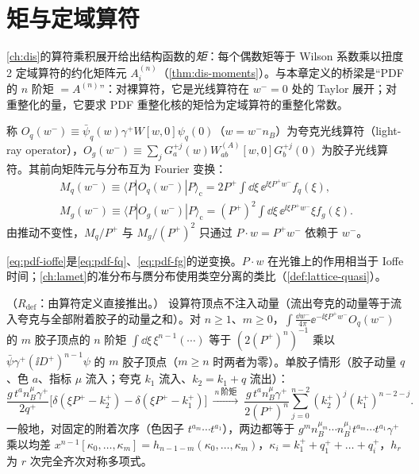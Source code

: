 \section{矩与定域算符}\label{sec:pdf-moments}

\cref{ch:dis}的算符乘积展开给出结构函数的\emph{矩}：每个偶数矩等于 Wilson 系数乘以扭度 2 定域算符的约化矩阵元 $A^{(n)}_i$（\cref{thm:dis-moments}）。与本章定义的桥梁是“PDF 的 $n$ 阶矩 $=A^{(n)}$”：对裸算符，它是光线算符在 $w^-=0$ 处的 Taylor 展开；对重整化的量，它要求 PDF 重整化核的矩恰为定域算符的重整化常数。

\begin{definition}[光线算符]\label{def:pdf-lightray}
称 $O_q(w^-)\equiv\bar\psi_q(w)\gamma^+W[w,0]\psi_q(0)$（$w=w^-n_B$）为夸克光线算符（light-ray operator），$O_g(w^-)\equiv\sum_jG^{+j}_a(w)W^{(A)}_{ab}[w,0]G^{+j}_b(0)$ 为胶子光线算符。其前向矩阵元与分布互为 Fourier 变换：
\begin{equation}\label{eq:pdf-ioffe}
\begin{gathered}
M_q(w^-)\equiv\langle P|O_q(w^-)|P\rangle_{\mathrm c}=2P^+\!\int\!\dd\xi\,\ee^{\ii\xi P^+w^-}f_q(\xi),\\
M_g(w^-)\equiv\langle P|O_g(w^-)|P\rangle_{\mathrm c}=(P^+)^2\!\int\!\dd\xi\,\ee^{\ii\xi P^+w^-}\xi f_g(\xi).
\end{gathered}
\end{equation}
由推动不变性，$M_q/P^+$ 与 $M_g/(P^+)^2$ 只通过 $P\cdot w=P^+w^-$ 依赖于 $w^-$。
\end{definition}

\cref{eq:pdf-ioffe}是\cref{eq:pdf-fq}、\cref{eq:pdf-fg}的逆变换。$P\cdot w$ 在光锥上的作用相当于 Ioffe 时间；\cref{ch:lamet}的准分布与赝分布使用类空分离的类比（\cref{def:lattice-quasi}）。

\begin{lemma}[Wilson 线顶点的矩 = 定域算符顶点 \tagR]\label{lem:pdf-wilson-moments}
（$R_{\mathrm{def}}$：由算符定义直接推出。）
设算符顶点不注入动量（流出夸克的动量等于流入夸克与全部附着胶子的动量之和）。对 $n\ge1$、$m\ge0$，$\int\frac{\dd w^-}{4\pi}\ee^{-\ii\xi P^+w^-}O_q(w^-)$ 的 $m$ 胶子顶点的 $n$ 阶矩 $\int\dd\xi\,\xi^{n-1}(\cdots)$ 等于 $(2(P^+)^n)^{-1}$ 乘以 $\bar\psi\gamma^+(\ii D^+)^{n-1}\psi$ 的 $m$ 胶子顶点（$m\ge n$ 时两者为零）。单胶子情形（胶子动量 $q$、色 $a$、指标 $\mu$ 流入；夸克 $k_1$ 流入、$k_2=k_1+q$ 流出）：
\begin{equation}\label{eq:pdf-vertex1}
\frac{g\,t^an_B^\mu\gamma^+}{2q^+}\Big[\delta(\xi P^+-k_2^+)-\delta(\xi P^+-k_1^+)\Big]\ \xrightarrow{\ n\ \text{阶矩}\ }\ \frac{g\,t^an_B^\mu\gamma^+}{2(P^+)^n}\sum_{j=0}^{n-2}(k_2^+)^j(k_1^+)^{n-2-j}.
\end{equation}
一般地，对固定的附着次序（色因子 $t^{a_m}\cdots t^{a_1}$），两边都等于 $g^mn_B^{\mu_m}\cdots n_B^{\mu_1}t^{a_m}\cdots t^{a_1}\gamma^+$ 乘以均差 $x^{n-1}[\kappa_0,\dots,\kappa_m]=h_{n-1-m}(\kappa_0,\dots,\kappa_m)$，$\kappa_i=k_1^++q_1^++\dots+q_i^+$，$h_r$ 为 $r$ 次完全齐次对称多项式。
\end{lemma}

